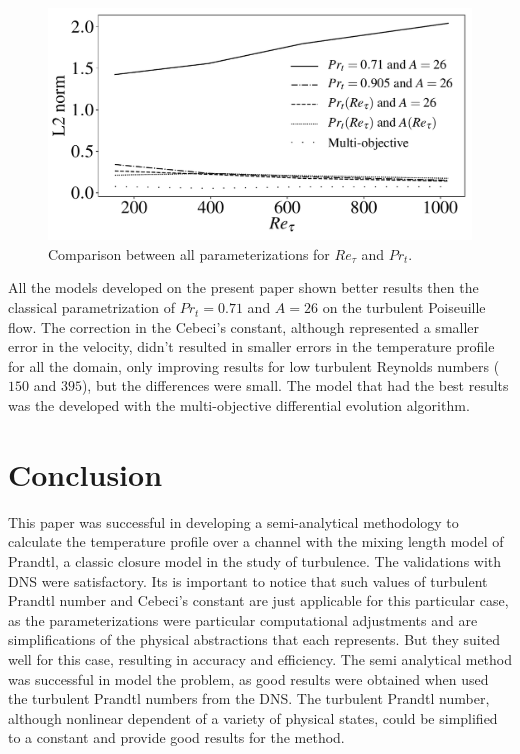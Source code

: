 \documentclass[10pt]{article} %
\begin{document}
\begin{figure}[!h]
	\centering
	\includegraphics[angle=0, scale=0.61]{fotos_formatacao_final/gerais}
	\caption{Comparison between all parameterizations for $Re_\tau$ and $Pr_t$.}
\end{figure}

All the models developed on the present paper shown better results then the classical parametrization of $Pr_t = 0.71$ and $A = 26$ on the turbulent Poiseuille flow. The correction in the Cebeci's constant, although represented a smaller error in the velocity, didn't resulted in smaller errors in the temperature profile for all the domain, only improving results for low turbulent Reynolds numbers ($150$ and $395$), but the differences were small. The model that had the best results was the developed with the multi-objective differential evolution algorithm.

\section{Conclusion}

This paper was successful in developing a semi-analytical methodology to calculate the temperature profile over a channel with the mixing length model of Prandtl, a classic closure model in the study of turbulence. The validations with DNS were satisfactory. Its is important to notice that such values of turbulent Prandtl number and Cebeci's constant are just applicable for this particular case, as the parameterizations were particular computational adjustments and are simplifications of the physical abstractions that each represents. But they suited well for this case, resulting in accuracy and efficiency. The semi analytical method was successful in model the problem, as good results were obtained when used the turbulent Prandtl numbers from the DNS. The turbulent Prandtl number, although nonlinear dependent of a variety of physical states, could be simplified to a constant and provide good results for the method.      
\end{document}
